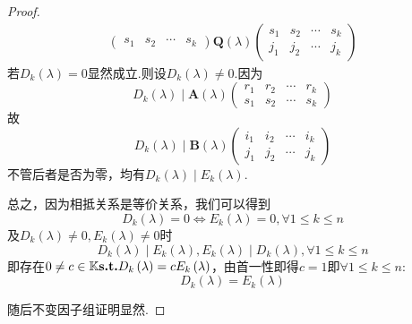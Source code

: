 {\begin{proof}
\begin{align*}
\begin{pmatrix}
                                          s_1 & s_2 & \cdots & s_k
                                      \end{pmatrix}
            \bm{Q}\left(\lambda\right)\begin{pmatrix}
                                          s_1 & s_2 & \cdots & s_k \\
                                          j_1 & j_2 & \cdots & j_k
                                      \end{pmatrix}
        \end{align*}
        若$D_k\left(\lambda\right)=0$显然成立.则设$D_k\left(\lambda\right)\neq 0.$因为
        \[
            D_k\left(\lambda\right)\mid \bm{A}\left(\lambda\right)\begin{pmatrix}
                r_1 & r_2 & \cdots & r_k \\
                s_1 & s_2 & \cdots & s_k
            \end{pmatrix}
        \]故
        \[
            D_k\left(\lambda\right)\mid \bm{B}\left(\lambda\right)\begin{pmatrix}
                i_1 & i_2 & \cdots & i_k \\
                j_1 & j_2 & \cdots & j_k
            \end{pmatrix}
        \]不管后者是否为零，均有$D_k\left(\lambda\right)\mid E_k\left(\lambda\right)$.

        总之，因为相抵关系是等价关系，我们可以得到
        \[
            D_k\left(\lambda\right)=0\Longleftrightarrow
            E_k\left(\lambda\right)=0,\forall 1\leqslant k\leqslant n
        \]及$D_k\left(\lambda\right)\neq 0,E_k\left(\lambda\right)\neq 0$时
        \[
            D_k\left(\lambda\right)\mid E_k\left(\lambda\right),E_k\left(\lambda\right)\mid D_k\left(\lambda\right),\forall 1\leqslant k\leqslant n
        \]即存在$0\neq c\in\mathbb{K}\textup{\bfseries{s.t.}} D_k\left(\lambda\right)=cE_k\left(\lambda\right)$，由首一性即得$c=1$即$\forall1\leqslant k\leqslant n$:
        \[D_k\left(\lambda\right)=E_k\left(\lambda\right)\]

        随后不变因子组证明显然.
    \end{proof}
}
